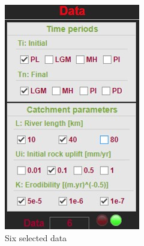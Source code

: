 \documentclass[11pt,a4paper,titlepage]{report}
\begin{document}
\begin{figure}[H]
\begin{subfigure}[H]{0.2\textwidth}
        \includegraphics[width=\textwidth]{data3.jpg}
        \caption{Six selected data}
    \end{subfigure}
    \quad
    \begin{subfigure}[H]{0.2\textwidth}

\end{subfigure}
\end{figure}
\end{document}
